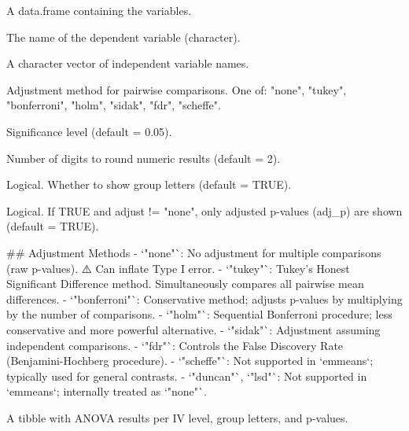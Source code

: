 \documentclass[a4paper]{book}
\begin{document}
\begin{Arguments}
\begin{ldescription}
\item[\code{data}] A data.frame containing the variables.

\item[\code{dv\_var}] The name of the dependent variable (character).

\item[\code{iv\_vars}] A character vector of independent variable names.

\item[\code{adjust}] Adjustment method for pairwise comparisons. One of:
"none", "tukey", "bonferroni", "holm", "sidak", "fdr", "scheffe".

\item[\code{alpha}] Significance level (default = 0.05).

\item[\code{digits}] Number of digits to round numeric results (default = 2).

\item[\code{show\_group\_letter}] Logical. Whether to show group letters (default = TRUE).

\item[\code{adjust\_only}] Logical. If TRUE and adjust != "none", only adjusted p-values (adj\_p) are shown (default = TRUE).
\end{ldescription}
\end{Arguments}
%
\begin{Details}
\#\# Adjustment Methods
- `"none"`: No adjustment for multiple comparisons (raw p-values). ⚠️ Can inflate Type I error.
- `"tukey"`: Tukey's Honest Significant Difference method. Simultaneously compares all pairwise mean differences.
- `"bonferroni"`: Conservative method; adjusts p-values by multiplying by the number of comparisons.
- `"holm"`: Sequential Bonferroni procedure; less conservative and more powerful alternative.
- `"sidak"`: Adjustment assuming independent comparisons.
- `"fdr"`: Controls the False Discovery Rate (Benjamini-Hochberg procedure).
- `"scheffe"`: Not supported in `emmeans`; typically used for general contrasts.
- `"duncan"`, `"lsd"`: Not supported in `emmeans`; internally treated as `"none"`.
\end{Details}
%
\begin{Value}
A tibble with ANOVA results per IV level, group letters, and p-values.
\end{Value}
%
\end{document}

